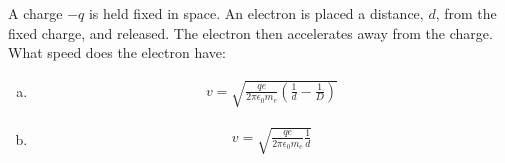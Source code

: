 \begin{solution}
\end{solution}

\question A charge $-q$ is held fixed in space. An electron is placed a distance, $d$, from the fixed charge, and released. The electron then accelerates away from the charge. What speed does the electron have:
\begin{finalanswer}
\begin{enumerate}[(a)]
\item \begin{align*}
v=\sqrt{\frac{qe}{2\pi\epsilon_0m_e}\left(\frac{1}{d}-\frac{1}{D} \right)}
\end{align*}
\item \begin{align*}
v=\sqrt{\frac{qe}{2\pi\epsilon_0m_e}\frac{1}{d}}
\end{align*}
\end{enumerate}
\end{finalanswer}
